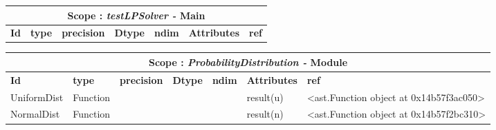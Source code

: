 \documentclass{report}
\begin{document}
 \vspace{1cm}

\begin{center}
\begin{longtable}{|p{3.5cm}|p{1.5cm}|p{1.5cm}|p{1.5cm}|p{1cm}|p{2cm}|p{4cm}| }
\hline
\multicolumn{7}{|c|}{\textbf{Scope : \qquad}  \textbf{\textit{testLPSolver - }Main}}\\ 
\hline
\textbf{Id} & \textbf{type} & \textbf{precision} & \textbf{Dtype} & \textbf{ndim} & \textbf{Attributes} & \textbf{ref} \\\hline

\end{longtable}
\end{center}

 \vspace{1cm}

\begin{center}
\begin{longtable}{|p{3.5cm}|p{1.5cm}|p{1.5cm}|p{1.5cm}|p{1cm}|p{2cm}|p{4cm}| }
\hline
\multicolumn{7}{|c|}{\textbf{Scope : \qquad}  \textbf{\textit{ProbabilityDistribution - }Module}}\\ 
\hline
\textbf{Id} & \textbf{type} & \textbf{precision} & \textbf{Dtype} & \textbf{ndim} & \textbf{Attributes} & \textbf{ref} \\\hline

UniformDist & Function &  &  &  & result(u) & <ast.Function object at 0x14b57f3ac050> \\\hline

NormalDist & Function &  &  &  & result(n) & <ast.Function object at 0x14b57f2bc310> \\\hline

\end{longtable}
\end{center}

 \vspace{1cm}
\end{document}
